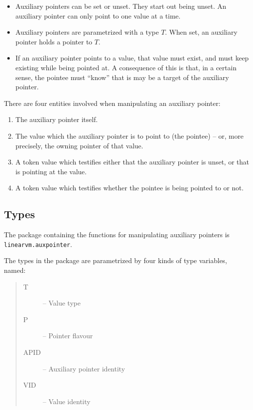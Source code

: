 \documentclass[a4paper]{book}
\begin{document}
\begin{itemize}
\item Auxiliary pointers can be set or unset. They start out being unset.
  An auxiliary pointer can only point to one value at a time.
\item Auxiliary pointers are parametrized with a type $T$.
  When set, an auxiliary pointer holds a pointer to $T$.
\item If an auxiliary pointer points to a value, that value must exist,
  and must keep existing while being pointed at.
  A consequence of this is that, in a certain sense, the pointee must ``know''
  that is may be a target of the auxiliary pointer.
\end{itemize}

\noindent
There are four entities involved when manipulating an auxiliary pointer:
\begin{enumerate}
\item The auxiliary pointer itself.
\item The value which the auxiliary pointer is to point to (the pointee) --
  or, more precisely, the owning pointer of that value.
\item A token value which testifies either that the auxiliary pointer is unset,
  or that is pointing at the value.
\item A token value which testifies whether the pointee is being
  pointed to or not.
\end{enumerate}

\subsection*{Types}
The package containing the functions for manipulating auxiliary pointers is
\texttt{linearvm.auxpointer}.

\smallskip
The types in the package are parametrized by four kinds of type variables, named:
\begin{quote}
\begin{description}
\item[T] -- Value type
\item[P] -- Pointer flavour
\item[APID] -- Auxiliary pointer identity
\item[VID] -- Value identity
\end{description}
\end{quote}
\end{document}

